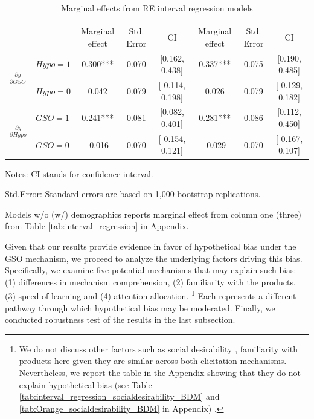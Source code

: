 \documentclass[12pt]{article}
\begin{document}
\vspace{0.5cm}



\begin{table}[htbp]
\centering
\footnotesize
\caption{Marginal effects from RE interval regression models}
\label{tab: Regression}
\begin{tabular}{llcccccc}
\toprule
 & &  &  \\
 & & Marginal effect & Std. Error& CI & Marginal effect & Std. Error&CI \\ \midrule
{} & $Hypo=1$ &0.300*** &0.070& [0.162, 0.438] &0.337***&0.075 & [0.190, 0.485]\\
                                              & $Hypo=0$ &0.042 &0.079& [-0.114, 0.198] &0.026&0.079 & [-0.129, 0.182]\\ \midrule

                                              
 & $GSO=1$ &0.241***  & 0.081&[0.082, 0.401]&0.281*** & 0.086&[0.112, 0.450]\\
                                                & $GSO=0$ &-0.016 &0.070 &[-0.154, 0.121]&-0.029 &0.070&[-0.167, 0.107] \\ \bottomrule


\end{tabular}
\begin{tablenotes}
\footnotesize

\item Notes: CI stands for confidence interval. 
\item Std.Error: Standard errors  are based on 1,000 bootstrap replications.
\item Models w/o (w/) demographics reports marginal effect from column one (three) from Table \ref{tab:interval_regression} in Appendix.
\end{tablenotes}
\end{table}




Given that our results provide evidence in favor of hypothetical bias under the GSO mechanism, we proceed to analyze the underlying factors driving this bias. Specifically, we examine five potential mechanisms that may explain such bias: (1) differences in mechanism comprehension,  (2) familiarity with the products,  (3) speed of learning and (4) attention allocation.  \footnote{We do not discuss other factors such as social desirability \citep{norwood2011social, entem2022using, lopez2021social, bursztyn2025social}, familiarity with products \citep{veettil_hypothetical_2024} here given they are similar across both elicitation mechanisms. Nevertheless, we report the table in the Appendix showing that they do not explain hypothetical bias (see Table \ref{tab:interval_regression_socialdesirability_BDM} and \ref{tab:Orange_socialdesirability_BDM}  in Appendix) .} Each represents a different pathway through which hypothetical bias may be moderated. Finally, we conducted robustness test of the results in the last subsection.
\end{document}
